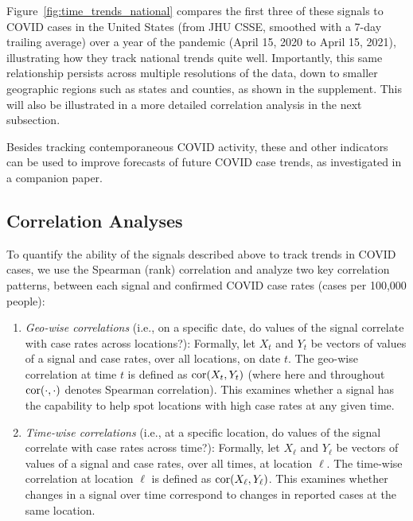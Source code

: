 \documentclass[9pt,twocolumn,twoside,lineno]{pnas-new}
\begin{document}
Figure~\ref{fig:time_trends_national} compares the first three of these signals
to COVID cases in the United States (from JHU CSSE, smoothed with a 7-day
trailing average) over a year of the pandemic (April 15, 2020 to April 15,
2021), illustrating how they track national trends quite well.  Importantly, 
this same relationship persists across multiple resolutions of the data, down to
smaller geographic regions such as states and counties, as shown in the
supplement.  This will also be illustrated in a more detailed correlation 
analysis in the next subsection.   

Besides tracking contemporaneous COVID activity, these and other indicators can
be used to improve forecasts of future COVID case trends, as investigated in a
companion paper.

\subsection{Correlation Analyses}

To quantify the ability of the signals described above to track trends in COVID
cases, we use the Spearman (rank) correlation and analyze two key correlation
patterns, between each signal and confirmed COVID case rates (cases per 100,000
people):

\begin{enumerate}
\item \textit{Geo-wise correlations} (i.e., on a specific date, do values of the
  signal correlate with case rates across locations?): Formally, let $X_t$ and
  $Y_t$ be vectors of values of a signal and case rates, over all locations, on
  date $t$. The geo-wise correlation at time $t$ is defined as $\mathrm{cor}(X_t, 
  Y_t)$ (where here and throughout $\mathrm{cor}(\cdot,\cdot)$ denotes Spearman 
  correlation). This examines whether a signal has the capability to help spot
  locations with high case rates at any given time.  

\item \textit{Time-wise correlations} (i.e., at a specific location, do values
  of the signal correlate with case rates across time?): Formally, let $X_\ell$
  and $Y_\ell$ be vectors of values of a signal and case rates, over all
  times, at location $\ell$. The time-wise correlation at location $\ell$ is
  defined as $\mathrm{cor}(X_\ell, Y_\ell)$. This examines whether changes in a signal
  over time correspond to changes in reported cases at the same 
  location.
\end{enumerate}
\end{document}
